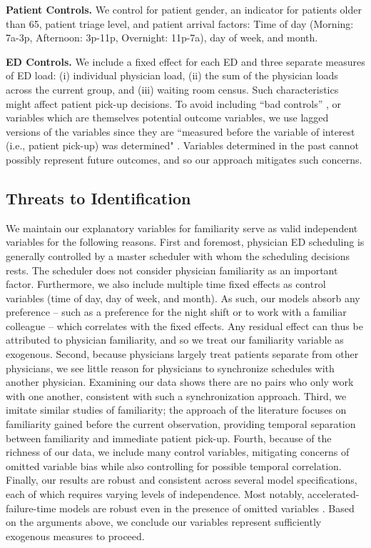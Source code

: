  \noindent \textbf{Patient Controls.} We control for patient gender, an indicator for patients older than 65, patient triage level, and patient arrival factors: Time of day (Morning: 7a-3p, Afternoon: 3p-11p, Overnight: 11p-7a), day of week, and month. 
 
 \noindent \textbf{ED Controls.} We include a fixed effect for each ED and three separate measures of ED load: (i) individual physician load, (ii) the sum of the physician loads across the current group, and (iii) waiting room census. Such characteristics might affect patient pick-up decisions. To avoid including “bad controls” , or variables which are themselves potential outcome variables, we use lagged versions of the variables since they are “measured before the variable of interest (i.e., patient pick-up) was determined" \citep[p. 68]{Angrist2009}. Variables determined in the past cannot possibly represent future outcomes, and so our approach mitigates such concerns.

 \subsection{Threats to Identification}
 We maintain our explanatory variables for familiarity serve as valid independent variables for the following reasons. First and foremost, physician ED scheduling is generally controlled by a master scheduler with whom the scheduling decisions rests. The scheduler does not consider physician familiarity as an important factor. Furthermore, we also include multiple time fixed effects as control variables (time of day, day of week, and month). As such, our models absorb any preference -- such as a preference for the night shift or to work with a familiar colleague -- which correlates with the fixed effects. Any residual effect can thus be attributed to physician familiarity, and so we treat our familiarity variable as exogenous. Second, because physicians largely treat patients separate from other physicians, we see little reason for physicians to synchronize schedules with another physician. Examining our data shows there are no pairs who only work with one another, consistent with such a synchronization approach. Third, we imitate similar studies of familiarity; the approach of the literature focuses on familiarity gained before the current observation, providing temporal separation between familiarity and immediate patient pick-up. Fourth, because of the richness of our data, we include many control variables, mitigating concerns of omitted variable bias while also controlling for possible temporal correlation. Finally, our results are robust and consistent across several model specifications, each of which requires varying levels of independence. Most notably, accelerated-failure-time models are robust even in the presence of omitted variables \citep{Keiding1997}. Based on the arguments above, we conclude our variables represent sufficiently exogenous measures to proceed.
 
